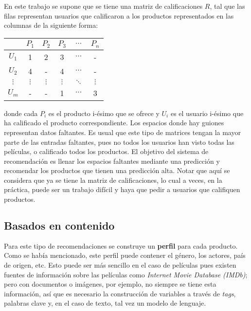 En este trabajo se supone que se tiene una matriz de calificaciones $R$, tal que las filas representan usuarios que calificaron a los productos representados en las columnas de la siguiente forma:

\begin{center}
\begin{tabular}{ c | c  c c c c}
    & $P_1$ & $P_2$ & $P_3$ & $\cdots$ & $P_n$ \\
  \hline                       
  $U_1$ &   1 &     2 &     3 & $\cdots$ &      - \\
  $U_2$ &   4 &     - &     4 & $\cdots$  &     -\\
  $\vdots$ & $\vdots$ & $\vdots$ & $\vdots$ & $\ddots$ & $\vdots$\\
  $U_m$ &   - &     - &     1 & $\cdots$ &      3\\
  \hline  
\end{tabular}
\end{center}

donde cada $P_i$ es el producto i-ésimo que se ofrece y $U_i$ es el usuario i-ésimo que ha calificado el producto correspondiente. Los espacios donde hay guiones representan datos faltantes. Es usual que este tipo de matrices tengan la mayor parte de las entradas faltantes, pues no todos los usuarios han visto todas las películas, o calificado todos los productos. El objetivo del sistema de recomendación es llenar los espacios faltantes mediante una predicción y recomendar los productos que tienen una predicción alta. Notar que aquí se considera que ya se tiene la matriz de calificaciones, lo cual a veces, en la práctica, puede ser un trabajo difícil y haya que pedir a usuarios que califiquen productos.

\subsection{Basados en contenido}

Para este tipo de recomendaciones se construye un \textbf{perfil} para cada producto. Como se había mencionado, este perfil puede contener el género, los actores, país de origen, etc. Esto puede ser más sencillo en el caso de películas pues existen fuentes de información sobre las películas como \textit{Internet Movie Database (IMDb)}; pero con documentos o imágenes, por ejemplo, no siempre se tiene esta información, así que es necesario la construcción de variables a través de \textit{tags}, palabras clave y, en el caso de texto, tal vez un modelo de lenguaje.

